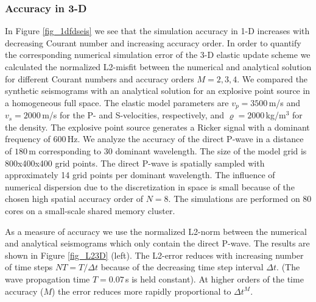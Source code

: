 \documentclass[11pt,onecolumn,oneside]{article}
\begin{document}

\newpage
\subsubsection{Accuracy in 3-D}
In Figure \ref{fig_1dfdseis} we see that the simulation accuracy in 1-D increases with decreasing Courant number and increasing accuracy order.  In order to quantify the corresponding numerical simulation error of the 3-D elastic update scheme we calculated the normalized L2-misfit between the numerical and analytical solution for different Courant numbers and accuracy orders 
$M = 2, 3, 4$. 
We compared the synthetic seismograms with an analytical solution for an explosive point source in a homogeneous full space. The elastic model parameters are $v_p=3500$\,m/s 
and $v_s=2000$\,m/s for the P- and S-velocities, respectively,  and $\varrho=2000$\,kg/m$^3$ for the density. The explosive point source generates  a Ricker signal with a dominant frequency of $600$\,Hz. We analyze the accuracy of the direct P-wave in a distance of $180$\,m corresponding to 30 dominant wavelength. The size of the model grid is 800x400x400 grid points. The direct P-wave is spatially sampled with approximately 14  grid points per dominant wavelength. The influence of numerical dispersion due to the discretization in space  is small because of the
chosen high spatial accuracy  order of $N=8$. The simulations are performed on 80 cores on a small-scale shared memory cluster.

As a measure of accuracy we use the normalized L2-norm between the numerical and analytical seismograms which only contain the direct P-wave. The results are shown
in Figure \ref{fig_L23D} (left). The L2-error reduces with increasing number of time steps $NT=T/\Delta t$ because of the decreasing time step interval $\Delta t$. (The wave propagation time $T=0.07$\,s is held constant).
At higher orders of the time accuracy ($M$) the error reduces more rapidly  proportional to $\Delta t^M$. 
\end{document}
